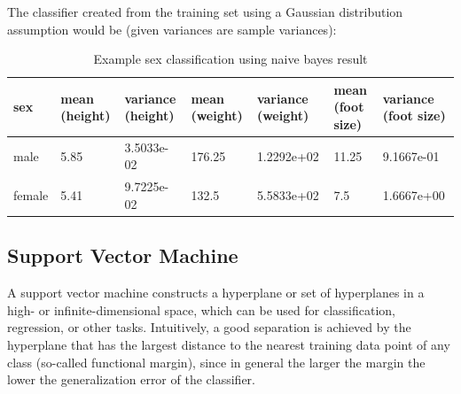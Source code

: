 \documentclass[12pt]{book}
\begin{document}
The classifier created from the training set using a Gaussian distribution assumption would be (given variances are sample variances):

\begin{longtable}[c]{ |p{2cm}|p{2cm}|p{2cm}|p{2cm}|p{2cm}|p{2cm}|p{2cm}|  }
  \caption{Example sex classification using naive bayes result \label{tab:sex_classification_naive_bayes_res}}\\
  \hline
  sex & mean (height) & variance (height) & mean (weight) & variance (weight) & mean (foot size) & variance (foot size)\\
  \hline
  \endhead
  male & 5.85 & 3.5033e-02 & 176.25 & 1.2292e+02 & 11.25 & 9.1667e-01\\
  \hline
  female & 5.41 & 9.7225e-02 & 132.5 & 5.5833e+02 & 7.5 & 1.6667e+00\\
  \hline
\end{longtable}
 

\subsection{Support Vector Machine}
A support vector machine constructs a hyperplane or set of hyperplanes in a high- or infinite-dimensional space, which can 
be used for classification, regression, or other tasks. Intuitively, a good separation is achieved 
by the hyperplane that has the largest distance to the nearest training data point of any class (so-called functional margin), 
since in general the larger the margin the lower the generalization error of the classifier.
\end{document}
